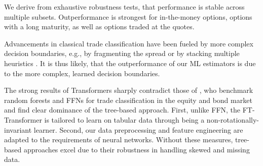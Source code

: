We derive from exhaustive robustness tests, that performance is stable across multiple subsets. Outperformance is strongest for in-the-money options, options with a long maturity, as well as options traded at the quotes.

Advancements in classical trade classification have been fueled by more complex decision boundaries, e.g., by fragmenting the spread \autocites{ellisAccuracyTradeClassification2000}{chakrabartyTradeClassificationAlgorithms2007} or by stacking multiple heuristics \autocite{grauerOptionTradeClassification2022}. It is thus likely, that the outperformance of our \gls{ML} estimators is due to the more complex, learned decision boundaries.

The strong results of Transformers sharply contradict those of \textcite[][]{ronenMachineLearningTrade2022}, who benchmark random forests and \glspl{FFN} for trade classification in the equity and bond market and find clear dominance of the tree-based approach. First, unlike \gls{FFN}, the FT-Transformer is tailored to learn on tabular data through being a non-rotationally-invariant learner. Second, our data preprocessing and feature engineering are adapted to the requirements of neural networks. Without these measures, tree-based approaches excel due to their robustness in handling skewed and missing data.

